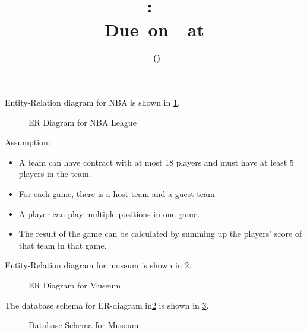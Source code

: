 \documentclass[12pt,letterpaper,titlepage,en-US]{article}
\title{
    \vspace{2in}
    \textmd{\textbf{\hmwkClassName \\\hmwkClass:\ \hmwkTitle}}\\
    \normalsize\vspace{0.1in}\small{Due\ on\ \DTMusedate{DueDate}\ at \DTMusetime{DueDate} }\\
    \vspace{0.1in}\large{\textit{\hmwkClassInstructor}}
    \vspace{3in}
}
\author{\textbf{\hmwkAuthorName\ \footnotesize{(\hmwkAuthorNetID)}} \\ \hmwkAuthorUTDEmail}
\date{}
\begin{document}
\maketitle


\pagebreak

\begin{homeworkProblem}
Entity-Relation diagram for NBA is shown in \cref{nba_er}.

\begin{figure}[!htb]
  \caption{ER Diagram for NBA League}
  \label{nba_er}
\end{figure}

Assumption:

\begin{itemize}
    \item A team can have contract with at most 18 players and must have at least 5 players in the team.
    \item For each game, there is a host team and a guest team.
    \item A player can play multiple positions in one game.
    \item The result of the game can be calculated by summing up the players' score of that team in that game.
\end{itemize}

\end{homeworkProblem}

\pagebreak

\begin{homeworkProblem}
\begin{homeworkSubProblem}

Entity-Relation diagram for museum is shown in \cref{museum_er}.

\begin{figure}[!htb]
  \caption{ER Diagram for Museum}
  \label{museum_er}
\end{figure}

\end{homeworkSubProblem}
\begin{homeworkSubProblem}

The database schema for ER-diagram in\cref{museum_er} is shown in \cref{museum_schema}.

\begin{figure}[!htb]
\centering
  \caption{Database Schema for Museum}
  \label{museum_schema}
\end{figure}

\end{homeworkSubProblem}
\end{homeworkProblem}
\end{document}
